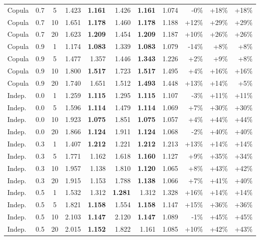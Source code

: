 \begin{table}[t]
\begin{tabular}{lcc | rrrrr | rrr}
    Copula & 0.7 & 5 & 1.423 & \textbf{1.161} & 1.426 & \textbf{1.161} & 1.074 & -0\% & +18\% & +18\% \\
    Copula & 0.7 & 10 & 1.651 & \textbf{1.178} & 1.460 & \textbf{1.178} & 1.188 & +12\% & +29\% & +29\% \\
    Copula & 0.7 & 20 & 1.623 & \textbf{1.209} & 1.454 & \textbf{1.209} & 1.187 & +10\% & +26\% & +26\% \\
    Copula & 0.9 & 1 & 1.174 & \textbf{1.083} & 1.339 & \textbf{1.083} & 1.079 & -14\% & +8\% & +8\% \\
    Copula & 0.9 & 5 & 1.477 & 1.357 & 1.446 & \textbf{1.343} & 1.226 & +2\% & +9\% & +8\% \\
    Copula & 0.9 & 10 & 1.800 & \textbf{1.517} & 1.723 & \textbf{1.517} & 1.495 & +4\% & +16\% & +16\% \\
    Copula & 0.9 & 20 & 1.740 & 1.651 & 1.512 & \textbf{1.493} & 1.448 & +13\% & +14\% & +5\% \\
    Indep. & 0.0 & 1 & 1.259 & \textbf{1.115} & 1.295 & \textbf{1.115} & 1.107 & -3\% & +11\% & +11\% \\
    Indep. & 0.0 & 5 & 1.596 & \textbf{1.114} & 1.479 & \textbf{1.114} & 1.069 & +7\% & +30\% & +30\% \\
    Indep. & 0.0 & 10 & 1.923 & \textbf{1.075} & 1.851 & \textbf{1.075} & 1.057 & +4\% & +44\% & +44\% \\
    Indep. & 0.0 & 20 & 1.866 & \textbf{1.124} & 1.911 & \textbf{1.124} & 1.068 & -2\% & +40\% & +40\% \\
    Indep. & 0.3 & 1 & 1.407 & \textbf{1.212} & 1.221 & \textbf{1.212} & 1.213 & +13\% & +14\% & +14\% \\
    Indep. & 0.3 & 5 & 1.771 & 1.162 & 1.618 & \textbf{1.160} & 1.127 & +9\% & +35\% & +34\% \\
    Indep. & 0.3 & 10 & 1.957 & 1.138 & 1.810 & \textbf{1.120} & 1.065 & +8\% & +43\% & +42\% \\
    Indep. & 0.3 & 20 & 1.915 & 1.153 & 1.788 & \textbf{1.138} & 1.066 & +7\% & +41\% & +40\% \\
    Indep. & 0.5 & 1 & 1.532 & 1.312 & \textbf{1.281} & 1.312 & 1.328 & +16\% & +14\% & +14\% \\
    Indep. & 0.5 & 5 & 1.821 & \textbf{1.158} & 1.554 & \textbf{1.158} & 1.147 & +15\% & +36\% & +36\% \\
    Indep. & 0.5 & 10 & 2.103 & \textbf{1.147} & 2.120 & \textbf{1.147} & 1.089 & -1\% & +45\% & +45\% \\
    Indep. & 0.5 & 20 & 2.015 & \textbf{1.152} & 1.822 & 1.161 & 1.085 & +10\% & +42\% & +43\% \\

\end{tabular}
\end{table}
